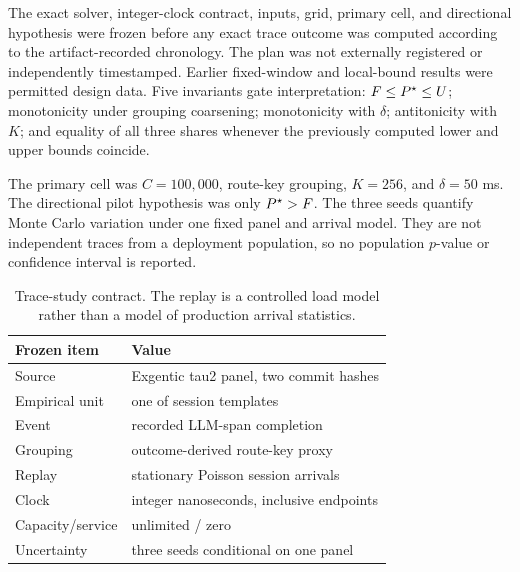 The exact solver, integer-clock contract, inputs, grid, primary cell, and
directional hypothesis were frozen before any exact trace outcome was
computed according to the artifact-recorded chronology. The plan was not
externally registered or independently timestamped. Earlier fixed-window and local-bound results were permitted design
data. Five invariants gate interpretation: $F\leq P^\star\leq U$; monotonicity
under grouping coarsening; monotonicity with $\delta$; antitonicity with
$K$; and equality of all three shares whenever the previously computed lower
and upper bounds coincide.

The primary cell was $C=100{,}000$, route-key grouping, $K=256$, and
$\delta=50$ ms.
The directional pilot hypothesis was only $P^\star>F$. The three seeds quantify
Monte Carlo variation under one fixed panel and arrival model. They are not
independent traces from a deployment population, so no population $p$-value or
confidence interval is reported.

\begin{table}[t]
  \centering
  \footnotesize
  \begin{tabularx}{\columnwidth}{@{}lX@{}}
    \toprule
    Frozen item & Value \\
    \midrule
    Source & Exgentic tau2 panel, two commit hashes \\
    Empirical unit & one of \TraceSessions{} session templates \\
    Event & recorded LLM-span completion \\
    Grouping & outcome-derived route-key proxy \\
    Replay & stationary Poisson session arrivals \\
    Clock & integer nanoseconds, inclusive endpoints \\
    Capacity/service & unlimited / zero \\
    Uncertainty & three seeds conditional on one panel \\
    \bottomrule
  \end{tabularx}
  \caption{Trace-study contract. The replay is a controlled load model rather
  than a model of production arrival statistics.}
  \label{tab:trace-contract}
\end{table}
